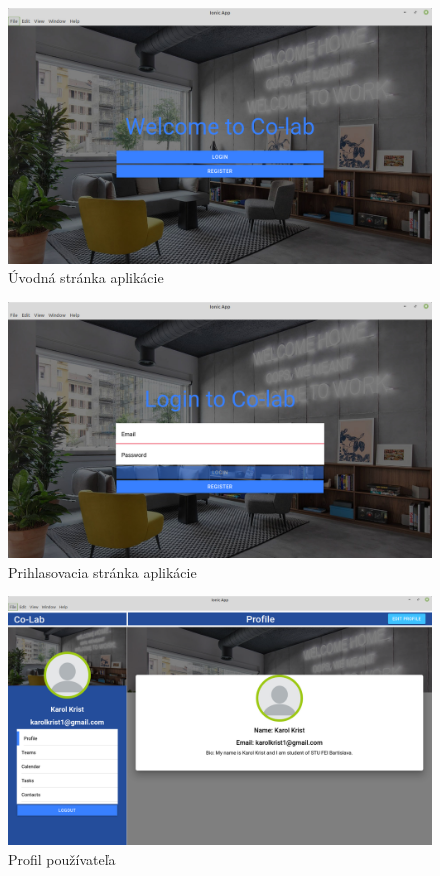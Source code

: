 \begin{figure}[H]
    \centering
    \includegraphics[scale=0.35]{img/design/intro.png}
    \caption{Úvodná stránka aplikácie}
    \label{fig:intro_design}
\end{figure}

\begin{figure}[H]
    \centering
    \includegraphics[scale=0.35]{img/design/login.png}
    \caption{Prihlasovacia stránka aplikácie}
    \label{fig:login_design}
\end{figure}

\begin{figure}[H]
    \centering
    \includegraphics[scale=0.30]{img/design/profile.png}
    \caption{Profil používateľa}
    \label{fig:profile}
\end{figure}

